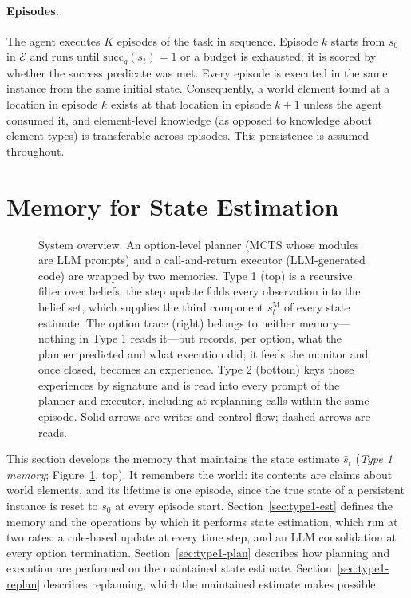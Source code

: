\documentclass[11pt]{article}
\newcommand{\calE}{\mathcal{E}}
\newcommand{\shat}{\hat{s}}
\newcommand{\sM}{s^{\mathrm{M}}}
\begin{document}
\paragraph{Episodes.}
The agent executes $K$ episodes of the task in sequence. Episode $k$ starts from $s_0$ in $\calE$ and runs until $\mathrm{succ}_g(s_t)=1$ or a budget is exhausted; it is scored by whether the success predicate was met. Every episode is executed in the same instance from the same initial state. Consequently, a world element found at a location in episode $k$ exists at that location in episode $k+1$ unless the agent consumed it, and element-level knowledge (as opposed to knowledge about element types) is transferable across episodes. This persistence is assumed throughout.


\section{Memory for State Estimation}
\label{sec:type1}

\begin{figure}[tb]
\centering
\resizebox{\textwidth}{!}{}
\caption{System overview. An option-level planner (MCTS whose modules are LLM prompts) and a call-and-return executor (LLM-generated code) are wrapped by two memories. Type 1 (top) is a recursive filter over beliefs: the step update folds every observation into the belief set, which supplies the third component $\sM_t$ of every state estimate. The option trace (right) belongs to neither memory---nothing in Type 1 reads it---but records, per option, what the planner predicted and what execution did; it feeds the monitor and, once closed, becomes an experience. Type 2 (bottom) keys those experiences by signature and is read into every prompt of the planner and executor, including at replanning calls within the same episode. Solid arrows are writes and control flow; dashed arrows are reads.}
\label{fig:overview}
\end{figure}

This section develops the memory that maintains the state estimate $\shat_t$ (\emph{Type 1 memory}; Figure~\ref{fig:overview}, top). It remembers the world: its contents are claims about world elements, and its lifetime is one episode, since the true state of a persistent instance is reset to $s_0$ at every episode start. Section~\ref{sec:type1-est} defines the memory and the operations by which it performs state estimation, which run at two rates: a rule-based update at every time step, and an LLM consolidation at every option termination. Section~\ref{sec:type1-plan} describes how planning and execution are performed on the maintained state estimate. Section~\ref{sec:type1-replan} describes replanning, which the maintained estimate makes possible.
\end{document}
